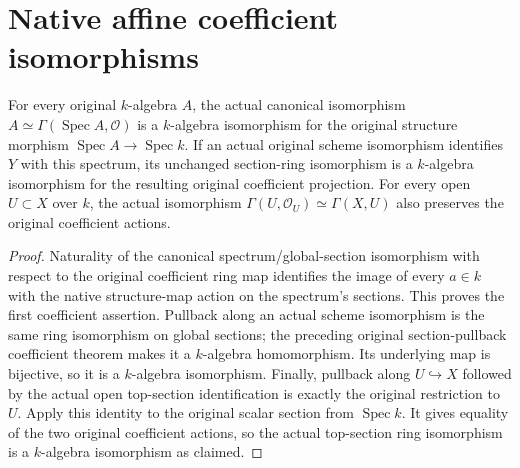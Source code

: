\section{Native affine coefficient isomorphisms}
\label{sec:scheme-affine-coefficient-equivalences}

\begin{theorem}
\label{thm:scheme-affine-coefficient-equivalences}
\leanok
{}
For every original $k$-algebra $A$, the actual canonical
isomorphism $A\simeq\Gamma(\operatorname{Spec}A,\mathcal O)$
is a $k$-algebra isomorphism for the original structure
morphism $\operatorname{Spec}A\to\operatorname{Spec}k$.
If an actual original scheme isomorphism identifies $Y$
with this spectrum, its unchanged section-ring isomorphism
is a $k$-algebra isomorphism for the resulting original
coefficient projection. For every open $U\subset X$ over
$k$, the actual isomorphism
$\Gamma(U,\mathcal O_U)\simeq\Gamma(X,U)$ also preserves
the original coefficient actions.
\end{theorem}

\begin{proof}
Naturality of the canonical spectrum/global-section
isomorphism with respect to the original coefficient ring
map identifies the image of every $a\in k$ with the native
structure-map action on the spectrum's sections. This proves
the first coefficient assertion. Pullback along an actual
scheme isomorphism is the same ring isomorphism on global
sections; the preceding original section-pullback coefficient
theorem makes it a $k$-algebra homomorphism. Its underlying
map is bijective, so it is a $k$-algebra isomorphism.
Finally, pullback along $U\hookrightarrow X$ followed by the
actual open top-section identification is exactly the
original restriction to $U$. Apply this identity to the
original scalar section from $\operatorname{Spec}k$.
It gives equality of the two original coefficient actions,
so the actual top-section ring isomorphism is a
$k$-algebra isomorphism as claimed.
\end{proof}
